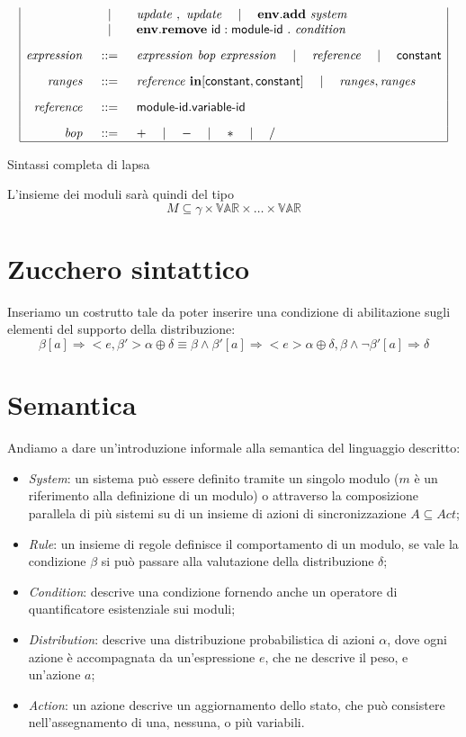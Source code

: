 \begin{table}
$$\begin{array}{|rcl|}
		& \quad\mid\quad & \mathit{update} \mbox{ } , \mbox{ } \mathit{update} \quad\mid\quad \mathbf{env.add} \mbox{ } \mathit{system} \\
		& \quad\mid\quad & \mathbf{env.remove} \mbox{ } {\sf id}:{\sf module}\textrm{-}{\sf id} \mbox{ } . \mbox{ } \mathit{condition} 
		\\[.3cm]
	\mathit{expression} &::=& \mathit{expression} \mbox{ } \mathit{bop} \mbox{ } \mathit{expression} \quad\mid\quad \mathit{reference} \quad\mid\quad {\sf constant}
		\\[.3cm]
	\mathit{ranges} &::=& \mathit{reference} \mbox{ } \mathbf{in} [{\sf constant}, {\sf constant}] \quad\mid\quad \mathit{ranges}, \mathit{ranges}
		\\[.3cm]
	\mathit{reference} &::=& {\sf module}\textrm{-}{\sf id} \mathbf{.} {\sf variable}\textrm{-}{\sf id}
		\\[.3cm]
	\mathit{bop} &::=& + \quad\mid\quad - \quad\mid\quad * \quad\mid\quad \slash
		\\
	\hline
	\end{array}
$$
\label{tab:lapsasyntax}
\caption{Sintassi completa di \ac{lapsa}}
\end{table}

L'insieme dei moduli sarà quindi del tipo
$$ M \subseteq \gamma \times \mathbb{VAR} \times \dots \times \mathbb{VAR} $$

\section{Zucchero sintattico}
Inseriamo un costrutto tale da poter inserire una condizione di abilitazione sugli elementi del supporto della distribuzione:
$$
\beta [a]\Rightarrow <e,\beta'> \alpha \oplus \delta
\equiv 
\beta \wedge \beta' [a]\Rightarrow <e> \alpha \oplus \delta,
\beta \wedge \neg\beta' [a]\Rightarrow \delta
$$

\section{Semantica}
Andiamo a dare un'introduzione informale alla semantica del linguaggio descritto:
\begin{itemize}
	\item \emph{System}: un sistema può essere definito tramite un singolo modulo ($m$ è un riferimento alla definizione di un modulo) o attraverso la composizione parallela di più sistemi su di un insieme di azioni di sincronizzazione $A \subseteq Act$;
	\item \emph{Rule}: un insieme di regole definisce il comportamento di un modulo, se vale la condizione $\beta$ si può passare alla valutazione della distribuzione $\delta$;
	\item \emph{Condition}: descrive una condizione fornendo anche un operatore di quantificatore esistenziale sui moduli;
	\item \emph{Distribution}: descrive una distribuzione probabilistica di azioni $\alpha$, dove ogni azione è accompagnata da un'espressione $e$, che ne descrive il peso, e un'azione $a$;
	\item \emph{Action}: un azione descrive un aggiornamento dello stato, che può consistere nell'assegnamento di una, nessuna, o più variabili.
\end{itemize}

